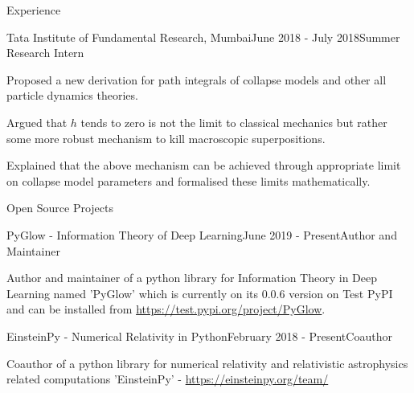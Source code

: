 \documentclass{resume} %
\begin{document}
\begin{rSection}{Experience}
\begin{rSubsection}{Tata Institute of Fundamental Research, Mumbai}{June 2018 - July 2018}{Summer Research Intern}{}
\item Proposed a new derivation for path integrals of collapse models and other all particle dynamics theories.
\item Argued that $h$ tends to zero is not the limit to classical mechanics but rather some more robust mechanism to kill macroscopic superpositions.
\item Explained that the above mechanism can be achieved through appropriate limit on collapse model parameters and formalised these limits mathematically.
\end{rSubsection}

\end{rSection}

\begin{rSection}{Open Source Projects}

\begin{rSubsection}{PyGlow - Information Theory of Deep Learning}{June 2019 - Present}{Author and Maintainer}{}
\item Author and maintainer of a python library for Information Theory in Deep Learning named 'PyGlow' which is currently on its 0.0.6 version on Test PyPI and can be installed from \url{https://test.pypi.org/project/PyGlow}.
\end{rSubsection}
\begin{rSubsection}{EinsteinPy - Numerical Relativity in Python}{February 2018 - Present}{Coauthor}{}
\item Coauthor of a python library for numerical relativity and relativistic astrophysics related computations 'EinsteinPy' - \url{https://einsteinpy.org/team/}
\end{rSubsection}

\end{rSection}
\end{document}

